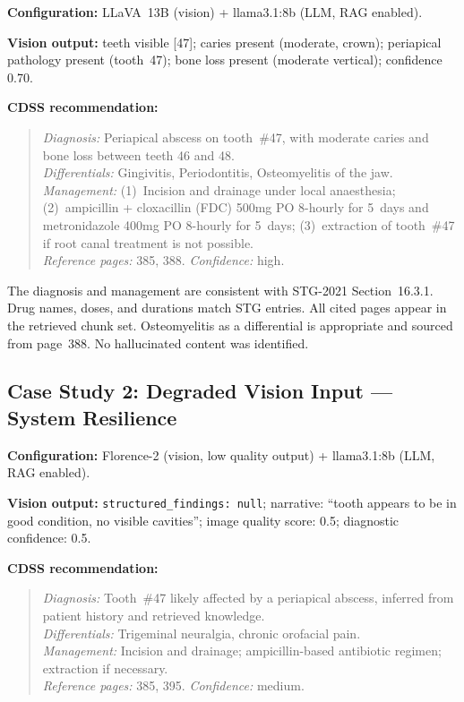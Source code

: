 \documentclass[12pt,a4paper]{report}
\begin{document}
\textbf{Configuration:} LLaVA~13B (vision) + llama3.1:8b (LLM, RAG enabled).

\textbf{Vision output:} teeth visible [47]; caries present (moderate, crown);
periapical pathology present (tooth~47); bone loss present (moderate vertical);
confidence 0.70.

\textbf{CDSS recommendation:}
\begin{quote}
\textit{Diagnosis:} Periapical abscess on tooth~\#47, with moderate caries and
bone loss between teeth 46 and 48. \\
\textit{Differentials:} Gingivitis, Periodontitis, Osteomyelitis of the jaw. \\
\textit{Management:} (1)~Incision and drainage under local anaesthesia;
(2)~ampicillin + cloxacillin (FDC) 500mg PO 8-hourly for 5~days and
metronidazole 400mg PO 8-hourly for 5~days;
(3)~extraction of tooth~\#47 if root canal treatment is not possible. \\
\textit{Reference pages:} 385, 388. \textit{Confidence:} high.
\end{quote}

The diagnosis and management are consistent with STG-2021 Section~16.3.1.
Drug names, doses, and durations match STG entries. All cited pages appear in
the retrieved chunk set. Osteomyelitis as a differential is appropriate and
sourced from page~388. No hallucinated content was identified.

\subsection{Case Study 2: Degraded Vision Input --- System Resilience}
\label{subsec:case2}

\textbf{Configuration:} Florence-2 (vision, low quality output) + llama3.1:8b (LLM, RAG enabled).

\textbf{Vision output:} \texttt{structured\_findings: null}; narrative: ``tooth
appears to be in good condition, no visible cavities''; image quality score:
0.5; diagnostic confidence: 0.5.

\textbf{CDSS recommendation:}
\begin{quote}
\textit{Diagnosis:} Tooth~\#47 likely affected by a periapical abscess,
inferred from patient history and retrieved knowledge. \\
\textit{Differentials:} Trigeminal neuralgia, chronic orofacial pain. \\
\textit{Management:} Incision and drainage; ampicillin-based antibiotic
regimen; extraction if necessary. \\
\textit{Reference pages:} 385, 395. \textit{Confidence:} medium.
\end{quote}
\end{document}
